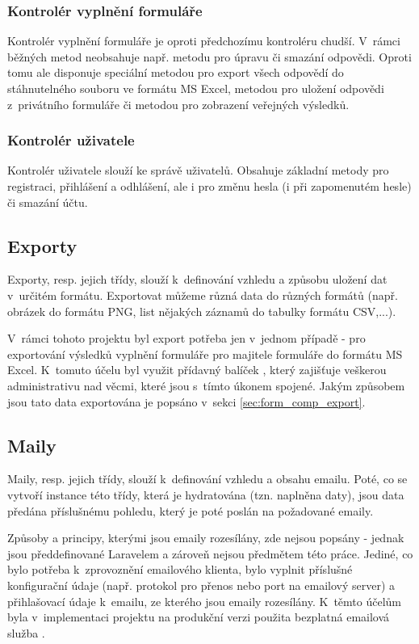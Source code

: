 		\subsubsection{Kontrolér vyplnění formuláře}
		Kontrolér vyplnění formuláře je oproti předchozímu kontroléru chudší. V~rámci běžných metod neobsahuje např. metodu pro úpravu či smazání odpovědi. Oproti tomu ale disponuje speciální metodou pro export všech odpovědí do stáhnutelného souboru ve formátu MS Excel, metodou pro uložení odpovědi z~privátního formuláře či metodou pro zobrazení veřejných výsledků.
		
		\subsubsection{Kontrolér uživatele}
		Kontrolér uživatele slouží ke správě uživatelů. Obsahuje základní metody pro registraci, přihlášení a odhlášení, ale i pro změnu hesla (i při zapomenutém hesle) či smazání účtu.
	
	\subsection{Exporty}\label{sec:exports}
	Exporty, resp. jejich třídy, slouží k~definování vzhledu a způsobu uložení dat v~určitém formátu. Exportovat můžeme různá data do různých formátů (např. obrázek do formátu PNG, list nějakých záznamů do tabulky formátu CSV,...).
	
	V~rámci tohoto projektu byl export potřeba jen v~jednom případě - pro exportování výsledků vyplnění formuláře pro majitele formuláře do formátu MS Excel. K~tomuto účelu byl využit přídavný balíček , který zajišťuje veškerou administrativu nad věcmi, které jsou s~tímto úkonem spojené. Jakým způsobem jsou tato data exportována je popsáno v~sekci \ref{sec:form_comp_export}.
	
	\subsection{Maily}
	Maily, resp. jejich třídy, slouží k~definování vzhledu a obsahu emailu. Poté, co se vytvoří instance této třídy, která je hydratována (tzn. naplněna daty), jsou data předána příslušnému pohledu, který je poté poslán na požadované emaily.
	
	Způsoby a principy, kterými jsou emaily rozesílány, zde nejsou popsány - jednak jsou předdefinované Laravelem a zároveň nejsou předmětem této práce. Jediné, co bylo potřeba k~zprovoznění emailového klienta, bylo vyplnit příslušné konfigurační údaje (např. protokol pro přenos nebo port na emailový server) a přihlašovací údaje k~emailu, ze kterého jsou emaily rozesílány. K~těmto účelům byla v~implementaci projektu na produkční verzi použita bezplatná emailová služba .
	
